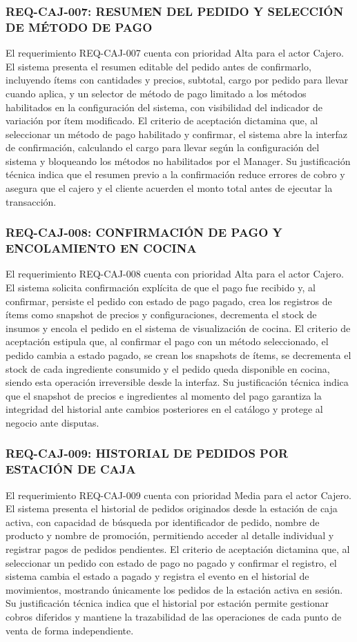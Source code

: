 \subsubsection{REQ-CAJ-007: RESUMEN DEL PEDIDO Y SELECCIÓN DE MÉTODO DE PAGO}
El requerimiento REQ-CAJ-007 cuenta con prioridad Alta para el actor Cajero. El sistema presenta el resumen editable del pedido antes de confirmarlo, incluyendo ítems con cantidades y precios, subtotal, cargo por pedido para llevar cuando aplica, y un selector de método de pago limitado a los métodos habilitados en la configuración del sistema, con visibilidad del indicador de variación por ítem modificado. El criterio de aceptación dictamina que, al seleccionar un método de pago habilitado y confirmar, el sistema abre la interfaz de confirmación, calculando el cargo para llevar según la configuración del sistema y bloqueando los métodos no habilitados por el Manager. Su justificación técnica indica que el resumen previo a la confirmación reduce errores de cobro y asegura que el cajero y el cliente acuerden el monto total antes de ejecutar la transacción.

\subsubsection{REQ-CAJ-008: CONFIRMACIÓN DE PAGO Y ENCOLAMIENTO EN COCINA}
El requerimiento REQ-CAJ-008 cuenta con prioridad Alta para el actor Cajero. El sistema solicita confirmación explícita de que el pago fue recibido y, al confirmar, persiste el pedido con estado de pago pagado, crea los registros de ítems como snapshot de precios y configuraciones, decrementa el stock de insumos y encola el pedido en el sistema de visualización de cocina. El criterio de aceptación estipula que, al confirmar el pago con un método seleccionado, el pedido cambia a estado pagado, se crean los snapshots de ítems, se decrementa el stock de cada ingrediente consumido y el pedido queda disponible en cocina, siendo esta operación irreversible desde la interfaz. Su justificación técnica indica que el snapshot de precios e ingredientes al momento del pago garantiza la integridad del historial ante cambios posteriores en el catálogo y protege al negocio ante disputas.

\subsubsection{REQ-CAJ-009: HISTORIAL DE PEDIDOS POR ESTACIÓN DE CAJA}
El requerimiento REQ-CAJ-009 cuenta con prioridad Media para el actor Cajero. El sistema presenta el historial de pedidos originados desde la estación de caja activa, con capacidad de búsqueda por identificador de pedido, nombre de producto y nombre de promoción, permitiendo acceder al detalle individual y registrar pagos de pedidos pendientes. El criterio de aceptación dictamina que, al seleccionar un pedido con estado de pago no pagado y confirmar el registro, el sistema cambia el estado a pagado y registra el evento en el historial de movimientos, mostrando únicamente los pedidos de la estación activa en sesión. Su justificación técnica indica que el historial por estación permite gestionar cobros diferidos y mantiene la trazabilidad de las operaciones de cada punto de venta de forma independiente.

